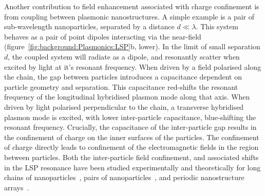 Another contribution to field enhancement associated with charge confinement is from coupling between plasmonic nanostructures. A simple example is a pair of sub-wavelength nanoparticles, separated by a distance $d \ll \lambda$. This system behaves as a pair of point dipoles interacting via the near-field (figure~\ref{fig:background:Plasmonics:LSP}b, lower). In the limit of small separation $d$, the coupled system will radiate as a dipole, and resonantly scatter when excited by light at it's resonant frequency. When driven by a field polarised along the chain, the gap between particles introduces a capacitance dependent on particle geometry and separation. This capacitance red-shifts the resonant frequency of the longitudinal hybridised plasmon mode along that axis. When driven by light polarised perpendicular to the chain, a transverse hybridised plasmon mode is excited, with lower inter-particle capacitance, blue-shifting the resonant frequency. Crucially, the capacitance of the inter-particle gap results in the confinement of charge on the inner surfaces of the particles. The confinement of charge directly leads to confinement of the electromagnetic fields in the region between particles. Both the inter-particle field confinement, and associated shifts in the LSP resonance have been studied experimentally and theoretically for long chains of nanoparticles~\cite{Krenn1999, Krenn1999a}, pairs of nanoparticles~\cite{Huang2016}, and periodic nanostructure arrays~\cite{Lee2016, Valev2011b, Valev2012a}.


